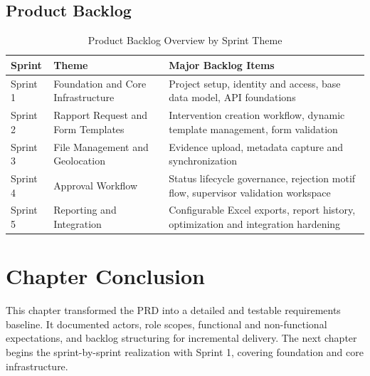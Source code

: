\subsection{Product Backlog}

\begin{table}[H]
\centering
\caption{Product Backlog Overview by Sprint Theme}
\label{tab:product_backlog_overview}
\begin{tabularx}{\textwidth}{|l|X|X|}
\hline
\textbf{Sprint} & \textbf{Theme} & \textbf{Major Backlog Items} \\
\hline
Sprint 1 & Foundation and Core Infrastructure & Project setup, identity and access, base data model, API foundations \\
\hline
Sprint 2 & Rapport Request and Form Templates & Intervention creation workflow, dynamic template management, form validation \\
\hline
Sprint 3 & File Management and Geolocation & Evidence upload, metadata capture and synchronization \\
\hline
Sprint 4 & Approval Workflow & Status lifecycle governance, rejection motif flow, supervisor validation workspace \\
\hline
Sprint 5 & Reporting and Integration & Configurable Excel exports, report history, optimization and integration hardening \\
\hline
\end{tabularx}
\end{table}

\section{Chapter Conclusion}

This chapter transformed the PRD into a detailed and testable requirements baseline. It documented actors, role scopes, functional and non-functional expectations, and backlog structuring for incremental delivery. The next chapter begins the sprint-by-sprint realization with Sprint 1, covering foundation and core infrastructure.
